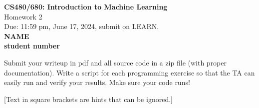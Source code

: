 \documentclass[10pt]{article}
\newcommand{\red}[1]{{\color{red}#1}}
\newcommand{\green}[1]{{\color{green}#1}}
\begin{document}
	
	\begin{center}
		\large{\textbf{CS480/680: Introduction to Machine Learning} \\ Homework 2\\ \red{Due: 11:59 pm, June 17, 2024}, \red{submit on LEARN}.} \\
		
		{\bf \green{NAME}} \\
		{\bf \green{student number}}
		
	\end{center}
	
	\begin{center}
		Submit your writeup in pdf and all source code in a zip file (with proper documentation). Write a script for each programming exercise so that the TA can easily run and verify your results. Make sure your code runs!
		
		[Text in square brackets are hints that can be ignored.]
	\end{center}
\end{document}
